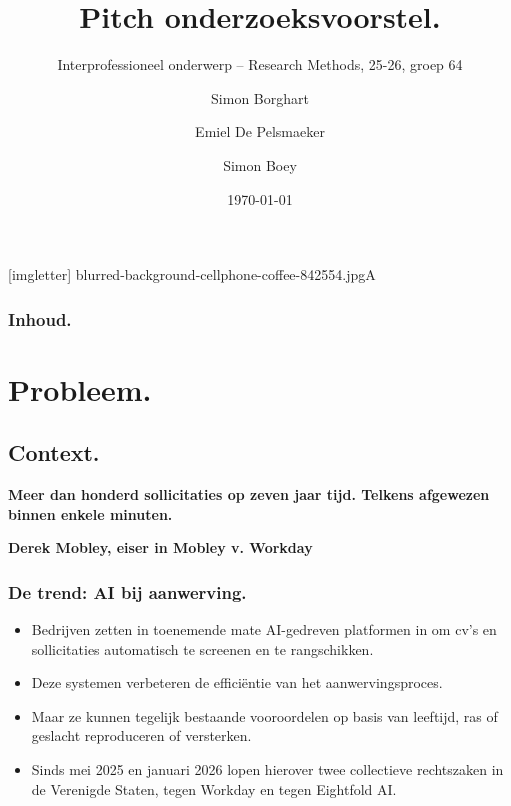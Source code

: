 \documentclass[aspectratio=169]{beamer}
\title{Pitch onderzoeksvoorstel.}
\subtitle{Interprofessioneel onderwerp -- Research Methods, 25-26, groep 64}
\author{Simon Borghart \and Emiel De Pelsmaeker \and Simon Boey}
\date{\today}
\begin{document}
{
    [imgletter]
        {blurred-background-cellphone-coffee-842554.jpg}{A}

    \begin{frame}
        \maketitle
    \end{frame}
}

\begin{frame}
    \frametitle{Inhoud.}

    \tableofcontents
\end{frame}


\section{Probleem.}

\subsection{Context.}

{

\begin{frame}

    {\huge \textbf{Meer dan honderd sollicitaties op zeven jaar tijd.
    Telkens afgewezen binnen enkele minuten.}}

    \bigskip

    \textbf{Derek Mobley, eiser in Mobley v. Workday}

\end{frame}
}

\begin{frame}
    \frametitle{De trend: AI bij aanwerving.}

    \begin{itemize}
        \item Bedrijven zetten in toenemende mate AI-gedreven platformen
            in om cv's en sollicitaties automatisch te screenen en te
            rangschikken.
        \item Deze systemen verbeteren de efficiëntie van het
            aanwervingsproces.
        \item Maar ze kunnen tegelijk bestaande vooroordelen op basis van
            leeftijd, ras of geslacht reproduceren of versterken.
        \item Sinds mei 2025 en januari 2026 lopen hierover twee
            collectieve rechtszaken in de Verenigde Staten, tegen Workday
            en tegen Eightfold AI.
    \end{itemize}
\end{frame}
\end{document}
